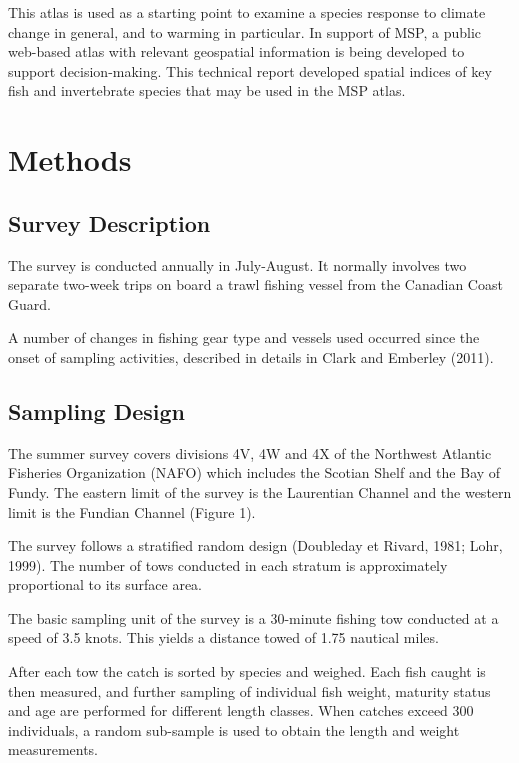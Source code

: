 \documentclass[12pt]{article}\usepackage[]{graphicx}\usepackage[]{color}
\begin{document}
This atlas is used as a starting point to examine a species response to climate change in general, and to warming in particular. In support of MSP, a public web-based atlas with relevant geospatial information is being developed to support decision-making. This technical report developed spatial indices of key fish and invertebrate species that may be used in the MSP atlas.

\section{Methods}\label{methods}

\subsection{Survey Description}\label{survey-description}

The survey is conducted annually in July-August. It normally involves two separate two-week trips on board a trawl fishing vessel from the Canadian Coast Guard.

A number of changes in fishing gear type and vessels used occurred since the onset of sampling activities, described in details in Clark and Emberley (2011).

\subsection{Sampling Design}\label{sampling-design}

The summer survey covers divisions 4V, 4W and 4X of the Northwest Atlantic Fisheries Organization (NAFO) which includes the Scotian Shelf and the Bay of Fundy. The eastern limit of the survey is the Laurentian Channel and the western limit is the Fundian Channel (Figure 1).

The survey follows a stratified random design (Doubleday et Rivard, 1981; Lohr, 1999). The number of tows conducted in each stratum is approximately proportional to its surface area.

The basic sampling unit of the survey is a 30-minute fishing tow conducted at a speed of 3.5 knots. This yields a distance towed of 1.75 nautical miles.

After each tow the catch is sorted by species and weighed. Each fish caught is then measured, and further sampling of individual fish weight, maturity status and age are performed for diﬀerent length classes. When catches exceed 300 individuals, a random sub-sample is used to obtain the length and weight measurements.
\end{document}
